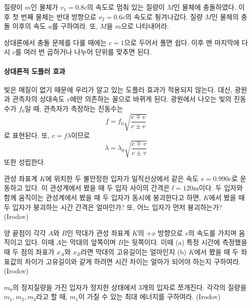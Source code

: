 \begin{exercise}
질량이 $m$인 물체가 $v_1=0.8c$의 속도로 멈춰 있는 질량이 $M$인 물체에 충돌하였다. 이후 첫 번째 물체는 반대 방향으로 $v_2=0.6c$의 속도로 튕겨나갔다. 질량 $M$인 물체의 충돌 이후의 속도 $u$를 구하여라. 또, $M$을 $m$으로 나타내어라.
\end{exercise}
상대론에서 충돌 문제를 다룰 때에는 $c=1$으로 두어서 풀면 쉽다. 이후 맨 마지막에 다시 $c$를 여러 번 곱하거나 나누어 단위를 맞추면 된다.

\paragraph{상대론적 도플러 효과}
빛은 매질이 없기 때문에 우리가 알고 있는 도플러 효과가 적용되지 않는다. 대신, 광원과 관측자의 상대속도 $v$에만 의존하는 꼴으로 바뀌게 된다. 광원에서 나오는 빛의 진동수가 $f_0$일 때, 관측자가 측정하는 진동수는
\begin{equation}
f=f_0\sqrt{\frac{c\mp v}{c\pm v}}
\end{equation}
로 표현된다. 또, $c=f\lambda$이므로
\begin{equation}
\lambda=\lambda_0\sqrt{\frac{c\mp v}{c\pm v}}
\end{equation}
또한 성립한다.

\begin{problem}
관성 좌표계 $K$에 위치한 두 불안정한 입자가 일직선상에서 같은 속도 $v=0.990c$로 운동하고 있다. 이 관성계에서 봤을 때 두 입자 사이의 간격은 $l=120\mathrm{m}$이다. 두 입자와 함께 움직이는 관성계에서 봤을 때 두 입자가 동시에 붕괴한다고 하면, $K$에서 봤을 때 두 입자가 붕괴하는 시간 간격은 얼마인가? 또, 어느 입자가 먼저 붕괴하는가? (Irodov)
\end{problem}

\begin{problem}
양 끝점이 각각 $A$와 $B$인 막대가 관성 좌표계 $K$의 $+x$ 방향으로 $v$의 속도를 가지며 움직이고 있다. 이때 $A$는 막대의 앞쪽이며 $B$는 뒷쪽이다. 이때 (a) 특정 시간에 측정했을 때 두 점의 좌표가 $x_A$와 $x_B$라면 막대의 고유길이는 얼마인지 (b) $K$에서 봤을 때 두 좌표값의 차이가 고유길이와 같게 하려면 시간 차이는 얼마가 되어야 하는지 구하여라. (Irodov)
\end{problem}

\begin{problem}
$m_0$의 정지질량을 가진 입자가 정지한 상태에서 3개의 입자로 쪼개진다. 각각의 질량을 $m_1, m_2, m_3$라고 할 때, $m_1$이 가질 수 있는 최대 에너지를 구하여라. (Irodov)
\end{problem}

